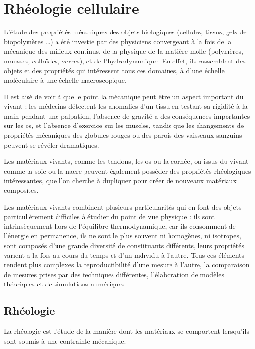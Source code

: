 \documentclass{report}
\begin{document}
\chapter{Rhéologie cellulaire}

L'étude des propriétés mécaniques des objets biologiques (cellules, tissus, gels de biopolymères \dots) a été investie par des physiciens convergeant à la fois de la mécanique des milieux continus, de la physique de la matière molle (polymères, mousses, colloïdes, verres), et de l'hydrodynamique. 
En effet, ils rassemblent des objets et des propriétés qui intéressent tous ces domaines, à d'une échelle moléculaire à une échelle macroscopique. 

Il est aisé de voir à quelle point la mécanique peut être un aspect important du vivant : les médecins détectent les anomalies d'un tissu en testant sa rigidité \og à la main \fg pendant une palpation, l'absence de gravité a des conséquences importantes sur les os, et l'absence d'exercice sur les muscles, tandis que les changements de propriétés mécaniques des globules rouges ou des parois des vaisseaux sanguins peuvent se révéler dramatiques. 

Les matériaux vivants, comme les tendons, les os ou la cornée, ou issus du vivant comme la soie ou la nacre peuvent également posséder des propriétés rhéologiques intéressantes, que l'on cherche à dupliquer pour créer de nouveaux matériaux composites. 

Les matériaux vivants combinent plusieurs particularités qui en font des objets particulièrement difficiles à étudier du point de vue physique : ils sont intrinsèquement hors de l'équilibre thermodynamique, car ils consomment de l'énergie en permanence, ils ne sont le plus souvent ni homogènes, ni isotropes, sont composés d'une grande diversité de constituants différents, leurs propriétés varient à la fois au cours du temps et d'un individu à l'autre. 
Tous ces éléments rendent plus complexes la reproductibilité d'une mesure à l'autre, la comparaison de mesures prises par des techniques différentes, l'élaboration de modèles théoriques et de simulations numériques.


\section{Rhéologie}

La rhéologie est l'étude de la manière dont les matériaux se comportent lorsqu'ils sont soumis à une contrainte mécanique.
\end{document}
